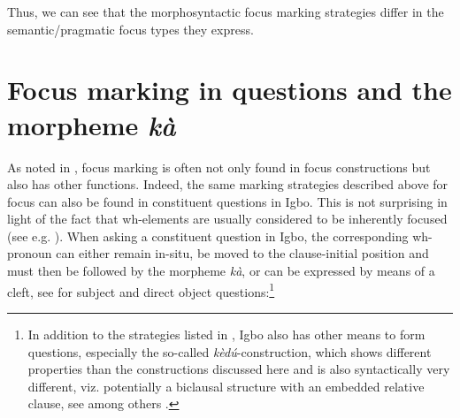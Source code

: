 \documentclass[output=paper,colorlinks,citecolor=brown]{langscibook}
\begin{document}


\enlargethispage{1.0\baselineskip}

Thus, we can see that the morphosyntactic focus marking strategies differ in the semantic\slash pragmatic focus types they express.

\section{Focus marking in questions and the morpheme \textit{kà}}\label{sec:amaechi:3}

As noted in \citet{FiedlerEtAl2010}, focus marking is often not only found in focus constructions but also has other functions. Indeed, the same marking strategies described above for focus can also be found in constituent questions in Igbo. This is not surprising in light of the fact that wh-elements are usually considered to be inherently focused (see e.g. \citealt{Rochemont1986, Horvath1986, Tuller1986, Beck2006, Haida2007}). When asking a constituent question in Igbo, the corresponding wh-pronoun can either remain in-situ, be moved to the clause-initial position and must then be followed by the morpheme \textit{kà}, or can be expressed by means of a cleft, see  for subject and direct object questions:\footnote{In addition to the strategies listed in , Igbo also has other means to form questions, especially the so-called \textit{kèd{\'u}}-construction, which shows different properties than the constructions discussed here and is also syntactically very different, viz. potentially a biclausal structure with an embedded relative clause, see among others \citet{Ikekeonwu1987, Ndimele1991, Nwankwegu2015, Ogbulogo1995, Amaechi2018}.}
\end{document}

